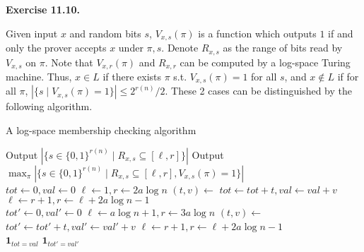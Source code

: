 \documentclass[a4paper]{article}
\newenvironment{exercise}[1]{
	\par
	\noindent\textbf{Exercise #1.}\quad
}{
	\par
	\bigskip
}
\begin{document}
    \begin{exercise}{11.10}
    	Given input $x$ and random bits $s$, $V_{x, s}(\pi)$ is a function which outputs $1$ if and only the prover accepts $x$ under $\pi, s$. Denote $R_{x, s}$ as the range of bits read by $V_{x, s}$ on $\pi$. Note that $V_{x, r}(\pi)$ and $R_{x, r}$ can be computed by a log-space Turing machine. Thus, $x \in L$ if there exists $\pi$ s.t. $V_{x, s}(\pi) = 1$ for all $s$, and $x \not\in L$ if for all $\pi$, $|\{s \mid V_{x, s}(\pi) = 1\}| \leq 2^{r(n)}/2$. These 2 cases can be distinguished by the following algorithm.

    	\begin{algorithm}[H]
        \caption{A log-space membership checking algorithm}\label{alg:soc}
        \begin{algorithmic}
             
            	\State Output $|\{s \in \{0,1\}^{r(n)} \mid R_{x, s} \subseteq [\ell, r]\}|$
            	\State Output $\max_\pi|\{s \in \{0,1\}^{r(n)} \mid R_{x, s} \subseteq [\ell, r], V_{x,s}(\pi) = 1\}|$
            \EndFunction
            \\
            \State $tot \gets 0, val \gets 0$
            \State $\ell \gets 1, r \gets 2a\log n$
            \While{$\ell \leq |\pi|$}
            	\State $(t, v) \gets $ 
            	\State $tot \gets tot + t, val \gets val + v$
            	\State $\ell \gets r + 1, r \gets \ell + 2a\log n - 1$
            \EndWhile
            \\
            \State $tot' \gets 0, val' \gets 0$
            \State $\ell \gets a\log n + 1, r \gets 3a\log n$
            \While{$\ell \leq |\pi|$}
            	\State $(t, v) \gets $ 
            	\State $tot' \gets tot' + t, val' \gets val' + v$
            	\State $\ell \gets r + 1, r \gets \ell + 2a\log n - 1$
            \EndWhile
            \\
      			\State \Return $\mathbf 1_{tot = val}$
            \Else
            	\State \Return $\mathbf 1_{tot' = val'}$
            \EndIf
        \end{algorithmic}
    \end{algorithm}
    \end{exercise}
\end{document}
